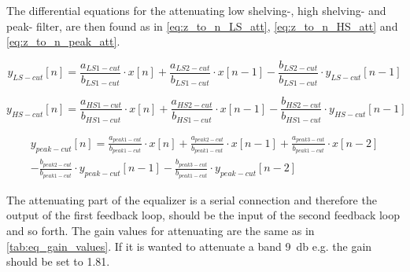     \startexplain
    \stopexplain
    
The differential equations for the attenuating low shelving-, high shelving- and peak- filter, are then found as in \autoref{eq:z_to_n_LS_att}, \autoref{eq:z_to_n_HS_att} and \autoref{eq:z_to_n_peak_att}.

\begin{equation}\label{eq:z_to_n_LS_att}
        y_{LS-cut}[n] = \frac{a_{LS1-cut}}{b_{LS1-cut}} \cdot x[n] + \frac{a_{LS2-cut}}{b_{LS1-cut}} \cdot x[n-1] -  \frac{b_{LS2-cut}}{b_{LS1-cut}} \cdot y_{LS-cut}[n-1]
    \end{equation}

\begin{equation}\label{eq:z_to_n_HS_att}
        y_{HS-cut}[n] = \frac{a_{HS1-cut}}{b_{HS1-cut}} \cdot x[n] + \frac{a_{HS2-cut}}{b_{HS1-cut}} \cdot x[n-1] -  \frac{b_{HS2-cut}}{b_{HS1-cut}} \cdot y_{HS-cut}[n-1]
    \end{equation}
    
\begin{equation}\label{eq:z_to_n_peak_att}
\begin{aligned}
y_{peak-cut}[n] = \frac{a_{peak1-cut}}{b_{peak1-cut}} \cdot x[n] + \frac{a_{peak2-cut}}{b_{peak1-cut}} \cdot x[n-1]+ \frac{a_{peak3-cut}} {b_{peak1-cut}} \cdot x[n-2] \\
- \frac{b_{peak2-cut}}{b_{peak1-cut}} \cdot y_{peak-cut}[n-1] - \frac{b_{peak3-cut}}{b_{peak1-cut}} \cdot y_{peak-cut}[n-2]
\end{aligned}
\end{equation}

The attenuating part of the equalizer is a serial connection and therefore the output of the first feedback loop, should be the input of the second feedback loop and so forth.
The gain values for attenuating are the same as in \autoref{tab:eq_gain_values}. If it is wanted to attenuate a band \SI{9}{\decibel} e.g. the gain should be set to 1.81.

